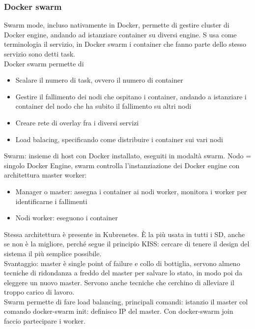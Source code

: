 \documentclass[16px]{article}
\begin{document}
\subsubsection{Docker swarm}
Swarm mode, incluso nativamente in Docker, permette di gestire cluster di Docker engine, andando ad istanziare container su diversi engine. S usa come terminologia il servizio, in Docker swarm i container che fanno parte dello stesso servizio sono detti task.\\ Docker swarm permette di
\begin{itemize}
\item Scalare il numero di task, ovvero il numero di container
\item Gestire il fallimento dei nodi che ospitano i container, andando a istanziare i container del nodo che ha subito il fallimento su altri nodi
\item Creare rete di overlay fra i diversi servizi
\item Load balacing, specificando come distribuire i container sui vari nodi
\end{itemize}
Swarm: insieme di host con Docker installato, eseguiti in modaltà swarm. Nodo = singolo Docker Engine, swarm controlla l'instanziazione dei Docker engine con architettura master worker:
\begin{itemize}
\item Manager o master: assegna i container ai nodi worker, monitora i worker per identificarne i fallimenti
\item Nodi worker: eseguono i container
\end{itemize}
Stessa architettura è presente in Kubrenetes. È la più usata in tutti i SD, anche se non è la migliore, perché segue il principio KISS: cercare di tenere il design del sistema il più semplice possibile.\\ Svantaggio: master è single point of failure e collo di bottiglia, servono almeno tecniche di ridondanza a freddo del master per salvare lo stato, in modo poi da eleggere un nuovo master. Servono anche tecniche che cerchino di alleviare il troppo carico di lavoro.\\ Swarm permette di fare load balancing, principali comandi: istanzio il master col comando docker-swarm init: definisco IP del master. Con docker-swarm join faccio partecipare i worker.
\end{document}
